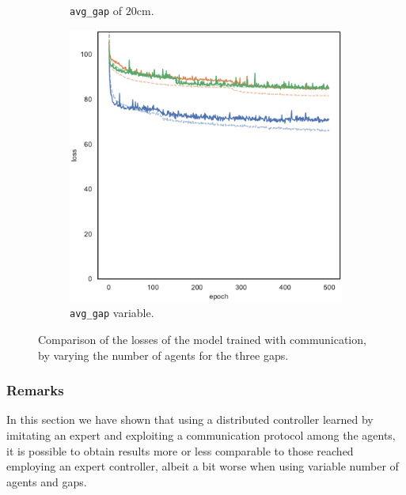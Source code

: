 \begin{figure}[!htb]
\begin{center}
\begin{subfigure}[h]{0.32\textwidth}
			\caption{\texttt{avg\_gap} of $20$\gls{cm}.}
		\end{subfigure}
		\hfill
		\begin{subfigure}[h]{0.32\textwidth}
			\includegraphics[width=\textwidth]{contents/images/task1-comm-extension/loss-communication-gap_var@copy}
			\caption{\texttt{avg\_gap} variable.}
		\end{subfigure}
	\end{center}
	\vspace{-0.5cm}
	\caption[Losses summary of the second set of experiments 
	(communication).]{Comparison of the losses of the model trained with 
		communication, by varying the number of agents for the three gaps.}
	\label{fig:commlossexte81324}
\end{figure}


\subsubsection{Remarks}
\label{subsubsec:remarks-task1-comm}

In this section we have shown that using a distributed controller learned by 
imitating an expert and exploiting a communication protocol among the 
agents, it is possible to obtain results more or less comparable to those reached 
employing an expert controller, albeit a bit worse when using variable number of 
agents and gaps.
